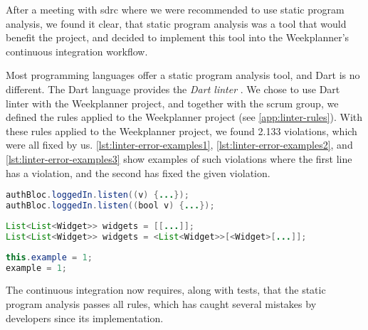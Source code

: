 After a meeting with \gls{sdrc} where we were recommended to use static program analysis, we found it clear, that static program analysis was a tool that would benefit the project, and decided to implement this tool into the Weekplanner's continuous integration workflow.

Most programming languages offer a static program analysis tool, and Dart is no different. The Dart language provides the \textit{Dart linter} \cite{dart_linter_2019}. We chose to use Dart linter with the Weekplanner project, and together with the scrum group, we defined the rules applied to the Weekplanner project (see \autoref{app:linter-rules}). With these rules applied to the Weekplanner project, we found 2.133 violations, which were all fixed by us. \autoref{lst:linter-error-examples1}, \autoref{lst:linter-error-examples2}, and \autoref{lst:linter-error-examples3} show examples of such violations where the first line has a violation, and the second has fixed the given violation.

\begin{lstlisting}[label={lst:linter-error-examples1},caption={Missing type for parameter},language=java]
authBloc.loggedIn.listen((v) {...});
authBloc.loggedIn.listen((bool v) {...});
\end{lstlisting}

\begin{lstlisting}[label={lst:linter-error-examples2},caption={Missing type for list and list elements},language=java]
List<List<Widget>> widgets = [[...]];
List<List<Widget>> widgets = <List<Widget>>[<Widget>[...]];
\end{lstlisting}

\begin{lstlisting}[label={lst:linter-error-examples3},caption={Avoid using \textit{this} keyword if not necessary},language=java]
this.example = 1;
example = 1;
\end{lstlisting}

The continuous integration now requires, along with tests, that the static program analysis passes all rules, which has caught several mistakes by developers since its implementation.
